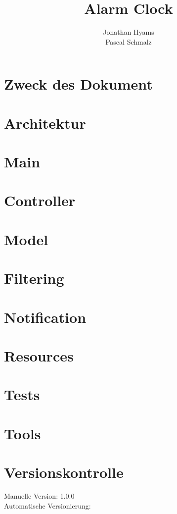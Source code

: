 \documentclass[11pt,titelpage]{scrartcl}
\title{Alarm Clock }
\author{Jonathan Hyams \\Pascal Schmalz}
\begin{document}
\thispagestyle{empty}
\maketitle
\pagebreak
\tableofcontents

\pagestyle{fancy}


\begin{abstract}
\end{abstract}
\pagebreak

\section{Zweck des Dokument}
%
\section{Architektur}

\section{Main}

\section{Controller}

\section{Model}

\section{Filtering}

\section{Notification}

\section{Resources}

\section{Tests}

\section{Tools}


\section{Versionskontrolle}
Manuelle Version: 1.0.0
\\

\noindent
Automatische Versionierung:
\immediate{}

\immediate{}
\end{document}
